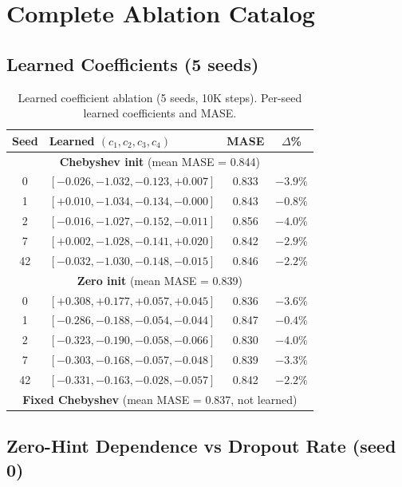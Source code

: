 \documentclass{article}
\begin{document}
\section{Complete Ablation Catalog}
\label{app:catalog}

\subsection{Learned Coefficients (5 seeds)}

\begin{table}[H]
\centering
\caption{Learned coefficient ablation (5 seeds, 10K steps). Per-seed learned coefficients and MASE.}
\small
\begin{tabular}{clcc}
\toprule
\textbf{Seed} & \textbf{Learned $(c_1, c_2, c_3, c_4)$} & \textbf{MASE} & \textbf{$\Delta$\%} \\
\midrule
\multicolumn{4}{c}{\textbf{Chebyshev init} (mean MASE = 0.844)} \\
\midrule
0 & $[-0.026, -1.032, -0.123, +0.007]$ & 0.833 & $-3.9\%$ \\
1 & $[+0.010, -1.034, -0.134, -0.000]$ & 0.843 & $-0.8\%$ \\
2 & $[-0.016, -1.027, -0.152, -0.011]$ & 0.856 & $-4.0\%$ \\
7 & $[+0.002, -1.028, -0.141, +0.020]$ & 0.842 & $-2.9\%$ \\
42 & $[-0.032, -1.030, -0.148, -0.015]$ & 0.846 & $-2.2\%$ \\
\midrule
\multicolumn{4}{c}{\textbf{Zero init} (mean MASE = 0.839)} \\
\midrule
0 & $[+0.308, +0.177, +0.057, +0.045]$ & 0.836 & $-3.6\%$ \\
1 & $[-0.286, -0.188, -0.054, -0.044]$ & 0.847 & $-0.4\%$ \\
2 & $[-0.323, -0.190, -0.058, -0.066]$ & 0.830 & $-4.0\%$ \\
7 & $[-0.303, -0.168, -0.057, -0.048]$ & 0.839 & $-3.3\%$ \\
42 & $[-0.331, -0.163, -0.028, -0.057]$ & 0.842 & $-2.2\%$ \\
\midrule
\multicolumn{4}{c}{\textbf{Fixed Chebyshev} (mean MASE = 0.837, not learned)} \\
\bottomrule
\end{tabular}
\end{table}

\subsection{Zero-Hint Dependence vs Dropout Rate (seed 0)}
\end{document}
